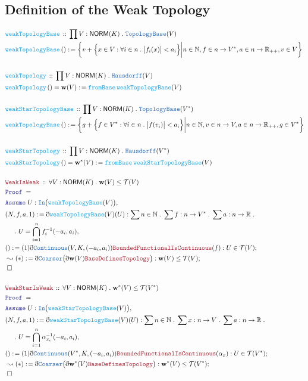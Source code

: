 \documentclass[12pt]{scrartcl}
\newcommand{\TYPE}[1]{\textcolor{NavyBlue}{\mathtt{#1}}}
\newcommand{\FUNC}[1]{\textcolor{Cerulean}{\mathtt{#1}}}
\newcommand{\LOGIC}[1]{\textcolor{Blue}{\mathtt{#1}}}
\newcommand{\THM}[1]{\textcolor{Maroon}{\mathtt{#1}}}
\renewcommand{\.}{\; . \;}
\newcommand{\de}{: \kern 0.1pc =}
\newcommand{\Act}[1]{\left( #1 \right)}
\newcommand{\Theorem}[2]{& \THM{#1} \, :: \, #2 \\ & \Proof = \\ }
\newcommand{\DeclareFunc}[2]{& \FUNC{#1} \, :: \, #2 \\}
\newcommand{\DefineFunc}[3]{&  \FUNC{#1}\Act{#2} \de #3 \\}
\newcommand{\DefineNamedFunc}[4]{&  \FUNC{#1}\Act{#2} = #3 \de #4 \\}
\newcommand{\NewLine}{\\ & \kern 1pc}
\newcommand{\Page}[1]{\begin{align*} #1 \end{align*} \newpage   }
\newcommand{ \bd }{ \ByDef }
\newcommand{\Reals}{\mathbb{R} }
\newcommand{\Nat}{\mathbb{N} }
\newcommand{\Say}[3]{& #1 \de #2 : #3, \\}
\newcommand{\Conclude}[3]{& #1 \de #2 : #3; \\}
\newcommand{\DeriveConclude}[3]{& \leadsto #1 \de #2 : #3 ; \\}
\newcommand{\A}{\LOGIC{Assume} \;}
\newcommand{\Assume}[2]{& \A #1 : #2, \\}
\newcommand{\QED}{\; \square}
\newcommand{\EndProof}{& \QED \\}
\newcommand{\ByDef}{\eth}
\newcommand{\Proof}{\LOGIC{Proof} \; }
\newcommand{\NORM}{\textsf{NORM}}
\begin{document}
\subsection{Definition of the Weak Topology}
\Page{
\DeclareFunc{weakTopologyBase}{\prod  V : \NORM(K) \. \TYPE{TopologyBase}(V)}
\DefineFunc{weakTopologyBase}{}{  \bigg\{ v + \Big\{  x \in V : \forall i \in n \. \big| f_i(x) \big| < a_i \Big\}  \bigg|  n \in \Nat, f \in n \to V^*, a \in n \to \Reals_{++}, v \in V  \bigg\} }
\\
\DeclareFunc{weakTopology}{\prod V : \NORM(K) \. \TYPE{Hausdorff}(V)}
\DefineNamedFunc{weakTopology}{}{\mathbf{w}(V)}{ \FUNC{fromBase} \, \FUNC{weakTopologyBase}(V)}
\\
\DeclareFunc{weakStarTopologyBase}{\prod  V : \NORM(K) \. \TYPE{TopologyBase}(V^*)}
\DefineFunc{weakTopologyBase}{}{ \bigg\{  g +  \Big\{  f \in V^* : \forall i \in n \. \big| f(v_i) \big| < a_i \Big\}  \bigg|  n \in \Nat, v \in n \to V, a \in n \to \Reals_{++}, g \in V^*  \bigg\} }
\\
\DeclareFunc{weakStarTopology}{\prod V : \NORM(K) \. \TYPE{Hausdorff}(V^*)}
\DefineNamedFunc{weakStarTopology}{}{\mathbf{w}^*(V)}{ \FUNC{fromBase} \, \FUNC{weakStarTopologyBase}(V)}
\\
\Theorem{WeakIsWeak}{\forall V : \NORM(K) \. \mathbf{w}(V) \le \mathcal{T}(V) }
\Assume{U}{\TYPE{In}\big(\FUNC{weakTopologyBase}(V)\big)}
\Say{(N,f,a,1)}{\bd \FUNC{weakTopologyBase}(V)(U) }{ \sum n \in \Nat \. \sum f : n \to V^* \. \sum a : n \to \Reals \.
 \NewLine \.
 U = \bigcap^n_{i = 1} f^{-1}_i(-a_i,a_i)}
\Conclude{()}{(1)\bd \TYPE{Continuous}(V,K,(-a_i,a_i))\THM{BoundedFunctionalIsContinuous}(f)}
{U \in \mathcal{T}(V)}
\DeriveConclude{(*)}{ \bd \TYPE{Coarser}\big( \bd \mathbf{w}(V)\THM{BaseDefinesTopology}\big)}{\mathbf{w}(V) \le \mathcal{T}(V)}
\EndProof
\\
\Theorem{WeakStarIsWeak}{\forall V : \NORM(K) \. \mathbf{w}^*(V) \le \mathcal{T}(V^*)}
\Assume{U}{\TYPE{In}\big(\FUNC{weakStarTopologyBase}(V)\big)}
\Say{(N,f,a,1)}{\bd \FUNC{weakStarTopologyBase}(V)(U) }{ \sum n \in \Nat \. \sum x : n \to V \. \sum a : n \to \Reals \.
 \NewLine \.
 U = \bigcap^n_{i = 1} \alpha_{x_i}^{-1}(-a_i,a_i)}
\Conclude{()}{(1)\bd \TYPE{Continuous}(V^*,K,(-a_i,a_i))\THM{BoundedFunctionalIsContinuous}(\alpha_x)}
{U \in \mathcal{T}(V^*)}
\DeriveConclude{(*)}{ \bd \TYPE{Coarser}\big( \bd \mathbf{w}^*(V)\THM{BaseDefinesTopology}\big)}{\mathbf{w}^*(V) \le \mathcal{T}(V^*)}
\EndProof
\\
}
\end{document}
